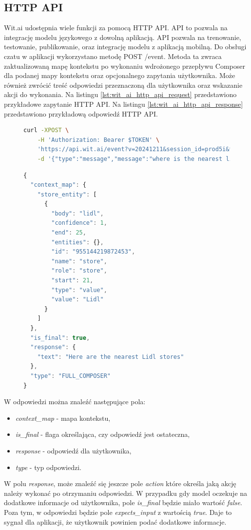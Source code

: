 \subsection{HTTP API}
Wit.ai udostępnia wiele funkcji za pomocą HTTP API. API to pozwala na integrację modelu językowego z dowolną aplikacją. API pozwala na trenowanie, testowanie, publikowanie, oraz integrację modelu z aplikacją mobilną. Do obsługi czatu w aplikacji wykorzystano metodę POST /event. Metoda ta zwraca zaktualizowaną mapę kontekstu po wykonaniu wdrożonego przepływu Composer dla podanej mapy kontekstu oraz opcjonalnego zapytania użytkownika. Może również zwrócić treść odpowiedzi przeznaczoną dla użytkownika oraz wskazanie akcji do wykonania. \cite{witai_http_api} Na listingu \ref{lst:wit_ai_http_api_request} przedstawiono przykładowe zapytanie HTTP API.
Na listingu \ref{lst:wit_ai_http_api_response} przedstawiono przykładową odpowiedź HTTP API.

\begin{figure}[H]
\begin{lstlisting}[language=bash, caption=Przykładowe zapytanie HTTP API, label=lst:wit_ai_http_api_request]
    curl -XPOST \
    -H 'Authorization: Bearer $TOKEN' \
    'https://api.wit.ai/event?v=20241211&session_id=prod5i&tag=1.0&context_map=%7B%7D' \
    -d '{"type":"message","message":"where is the nearest lidl?"}'  
\end{lstlisting}
\end{figure}

\begin{figure}[H]
\begin{lstlisting}[language=javascript, caption=Przykładowa odpowiedź HTTP API, label=lst:wit_ai_http_api_response]
{
  "context_map": {
    "store_entity": [
      {
        "body": "lidl",
        "confidence": 1,
        "end": 25,
        "entities": {},
        "id": "955144219872453",
        "name": "store",
        "role": "store",
        "start": 21,
        "type": "value",
        "value": "Lidl"
      }
    ]
  },
  "is_final": true,
  "response": {
    "text": "Here are the nearest Lidl stores"
  },
  "type": "FULL_COMPOSER"
}
\end{lstlisting}
\end{figure}

W odpowiedzi można znaleźć następujące pola:
\begin{itemize}
    \item \textit{context\_map} - mapa kontekstu,
    \item \textit{is\_final} - flaga określająca, czy odpowiedź jest ostateczna,
    \item \textit{response} - odpowiedź dla użytkownika,
    \item \textit{type} - typ odpowiedzi.
\end{itemize}
W polu \textit{response}, może znaleźć się jeszcze pole \textit{action} które określa jaką akcję należy wykonać po otrzymaniu odpowiedzi.
W przypadku gdy model oczekuje na dodatkowe informacje od użytkownika, pole \textit{is\_final} będzie miało wartość \textit{false}. Poza tym, w odpowiedzi będzie pole \textit{expects\_input} z wartością \textit{true}. Daje to sygnał dla aplikacji, że użytkownik powinien podać dodatkowe informacje.

